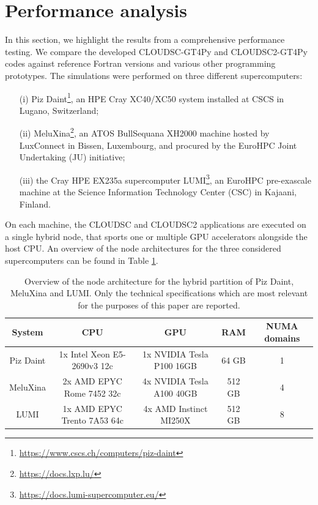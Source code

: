 \documentclass[gmd,manuscript,online]{copernicus}
\theoremstyle{theorem}
\theoremstyle{definition}
\theoremstyle{remark}
\theoremstyle{proposition}
\begin{document}
	\section{Performance analysis}
	\label{section:performance-analysis}

	In this section, we highlight the results from a comprehensive performance testing. We compare the developed CLOUDSC-GT4Py and CLOUDSC2-GT4Py codes against reference Fortran versions and various other programming prototypes. The simulations were performed on three different supercomputers:
	\begin{itemize}
		\item[(i)] Piz Daint\footnote{\url{https://www.cscs.ch/computers/piz-daint}}, an HPE Cray XC40/XC50 system installed at CSCS in Lugano, Switzerland;
		\item[(ii)] MeluXina\footnote{\url{https://docs.lxp.lu/}}, an ATOS BullSequana XH2000 machine hosted by LuxConnect in Bissen, Luxembourg, and procured by the EuroHPC Joint Undertaking (JU) initiative;
		\item[(iii)] the Cray HPE EX235a supercomputer LUMI\footnote{\url{https://docs.lumi-supercomputer.eu/}}, an EuroHPC pre-exascale machine at the Science Information Technology Center (CSC) in Kajaani, Finland.
	\end{itemize}
	On each machine, the CLOUDSC and CLOUDSC2 applications are executed on a single hybrid node, that sports one or multiple GPU accelerators alongside the host CPU. An overview of the node architectures for the three considered supercomputers can be found in Table \ref{tab:architecture}.

	\begin{table}[t!]
		\setlength\extrarowheight{2pt}
		\centering
		\begin{tabular}{|c|c|c|c|c|}
			\hline
			\textbf{System} & \textbf{CPU} & \textbf{GPU} & \textbf{RAM} & \textbf{NUMA domains} \\
			\hline
			Piz Daint & 1x Intel Xeon E5-2690v3 12c & 1x NVIDIA Tesla P100 16GB & 64 GB & 1 \\
			MeluXina & 2x AMD EPYC Rome 7452 32c & 4x NVIDIA Tesla A100 40GB & 512 GB & 4 \\
			LUMI & 1x AMD EPYC Trento 7A53 64c & 4x AMD Instinct MI250X & 512 GB & 8 \\
			\hline
		\end{tabular}
		\vspace*{0.2cm}
		\caption{Overview of the node architecture for the hybrid partition of Piz Daint, MeluXina and LUMI. Only the technical specifications which are most relevant for the purposes of this paper are reported.}
		\label{tab:architecture}
	\end{table}
\end{document}
